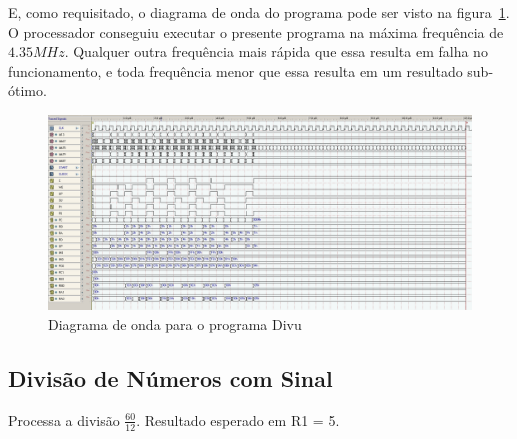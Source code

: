 \documentclass[12pt]{article}
\begin{document}
E, como requisitado, o diagrama de onda do programa pode ser visto na
figura~\ref{fig:program__divu_wave.png}. O processador conseguiu executar o
presente programa na máxima frequência de $4.35MHz$. Qualquer outra frequência
mais rápida que essa resulta em falha no funcionamento, e toda frequência menor
que essa resulta em um resultado sub-ótimo.

\begin{figure}[H]
    \centering
    \includegraphics[width=.9\textwidth]{Projeto/images/program__divu_wave.png}
    \caption{Diagrama de onda para o programa Divu}\label{fig:program__divu_wave.png}
\end{figure}


\subsection{Divisão de Números com Sinal}\label{sec:programs:div}

Processa a divisão $\frac{60}{12}$. Resultado esperado em R1 = 5.
\end{document}

